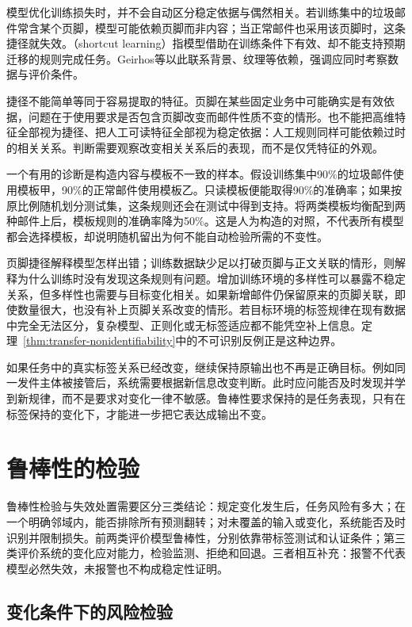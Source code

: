 模型优化训练损失时，并不会自动区分稳定依据与偶然相关。若训练集中的垃圾邮件常含某个页脚，模型可能依赖页脚而非内容；当正常邮件也采用该页脚时，这条捷径就失效。（shortcut learning）指模型借助在训练条件下有效、却不能支持预期迁移的规则完成任务。Geirhos等以此联系背景、纹理等依赖，强调应同时考察数据与评价条件。

捷径不能简单等同于容易提取的特征。页脚在某些固定业务中可能确实是有效依据，问题在于使用要求是否包含页脚改变而邮件性质不变的情形。也不能把高维特征全部视为捷径、把人工可读特征全部视为稳定依据：人工规则同样可能依赖过时的相关关系。判断需要观察改变相关关系后的表现，而不是仅凭特征的外观。

一个有用的诊断是构造内容与模板不一致的样本。假设训练集中90\%的垃圾邮件使用模板甲，90\%的正常邮件使用模板乙。只读模板便能取得90\%的准确率；如果按原比例随机划分测试集，这条规则还会在测试中得到支持。将两类模板均衡配到两种邮件上后，模板规则的准确率降为50\%。这是人为构造的对照，不代表所有模型都会选择模板，却说明随机留出为何不能自动检验所需的不变性。

页脚捷径解释模型怎样出错；训练数据缺少足以打破页脚与正文关联的情形，则解释为什么训练时没有发现这条规则有问题。增加训练环境的多样性可以暴露不稳定关系，但多样性也需要与目标变化相关。如果新增邮件仍保留原来的页脚关联，即使数量很大，也没有补上页脚关系改变的情形。若目标环境的标签规律在现有数据中完全无法区分，复杂模型、正则化或无标签适应都不能凭空补上信息。定理~\ref{thm:transfer-nonidentifiability}中的不可识别反例正是这种边界。

如果任务中的真实标签关系已经改变，继续保持原输出也不再是正确目标。例如同一发件主体被接管后，系统需要根据新信息改变判断。此时应问能否及时发现并学到新规律，而不是要求对变化一律不敏感。鲁棒性要求保持的是任务表现，只有在标签保持的变化下，才能进一步把它表达成输出不变。

\section{鲁棒性的检验}
\label{sec:robustness-evaluation}

鲁棒性检验与失效处置需要区分三类结论：规定变化发生后，任务风险有多大；在一个明确邻域内，能否排除所有预测翻转；对未覆盖的输入或变化，系统能否及时识别并限制损失。前两类评价模型鲁棒性，分别依靠带标签测试和认证条件；第三类评价系统的变化应对能力，检验监测、拒绝和回退。三者相互补充：报警不代表模型必然失效，未报警也不构成稳定性证明。

\subsection{变化条件下的风险检验}
\label{sec:robustness-risk-test}

